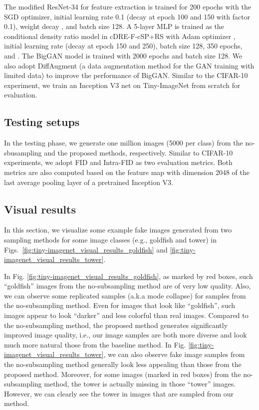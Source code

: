 \documentclass[10pt, twocolumn]{article}
\theoremstyle{definition}
\begin{document}
The modified ResNet-34 for feature extraction is trained for 200 epochs with the SGD optimizer, initial learning rate 0.1 (decay at epoch 100 and 150 with factor 0.1), weight decay , and batch size 128. A 5-layer MLP is trained as the conditional density ratio model in cDRE-F-cSP+RS with Adam optimizer \cite{kingma2014adam}, initial learning rate  (decay at epoch 150 and 250), batch size 128, 350 epochs, and . The BigGAN model is trained with 2000 epochs and batch size 128. We also adopt DiffAugment \cite{zhao2020differentiable} (a data augmentation method for the GAN training with limited data) to improve the performance of BigGAN. Similar to the CIFAR-10 experiment, we train an Inception V3 net on Tiny-ImageNet from scratch for evaluation.


\subsection{Testing setups} \label{supp:test_setup_of_tinyImageNet_exp}
In the testing phase, we generate one million images (5000 per class) from the no-sbusampling and the proposed methods, respectively. Similar to CIFAR-10 experiments, we adopt FID and Intra-FID as two evaluation metrics. Both metrics are also computed based on the feature map with dimension 2048 of the last average pooling layer of a pretrained Inception V3. 



\subsection{Visual results} \label{supp:details_of_tinyImageNet_visual_results}
In this section, we visualize some example fake images generated from two sampling methods for some image classes (e.g., goldfish and tower) in Figs.\ \ref{fig:tiny-imagenet_visual_results_goldfish} and \ref{fig:tiny-imagenet_visual_results_tower}. 

In Fig. \ref{fig:tiny-imagenet_visual_results_goldfish}, as marked by red boxes, such ``goldfish'' images from the no-subsampling method are of very low quality. Also, we can observe some replicated samples (a.k.a mode collapse) for samples from the no-subsampling method. Even for images that look like ``goldfish'', such images appear to look ``darker'' and less colorful than real images. Compared to the no-subsampling method, the proposed method generates significantly improved image quality, i.e., our image samples are both more diverse and look much more natural those from the baseline method. In Fig. \ref{fig:tiny-imagenet_visual_results_tower}, we can also observe fake image samples from the no-subsampling method generally look less appealing than those from the proposed method. Moreover, for some images (marked in red boxes) from the no-subsampling method, the tower is actually missing in those ``tower'' images. However, we can clearly see the tower in images that are sampled from our method.  
\end{document}

